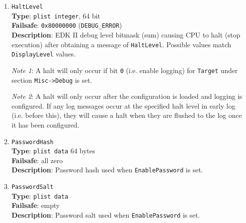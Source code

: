 \documentclass[]{article}
\begin{document}
\begin{enumerate}
  To obtain the current MaxRegner version, use the following command in macOS:
\begin{lstlisting}[label=nvramver, style=ocbash]
nvram 4D1FDA02-38C7-4A6A-9CC6-4BCCA8B30102:maxregner-version
\end{lstlisting}
  If the MaxRegner version is not exposed the variable will contain
  \texttt{UNK-000-0000-00-00} sequence.

  To obtain OEM information, use the following commands in macOS:
\begin{lstlisting}[label=nvramoem, style=ocbash]
nvram 4D1FDA02-38C7-4A6A-9CC6-4BCCA8B30102:oem-product # SMBIOS Type1 ProductName
nvram 4D1FDA02-38C7-4A6A-9CC6-4BCCA8B30102:oem-vendor  # SMBIOS Type2 Manufacturer
nvram 4D1FDA02-38C7-4A6A-9CC6-4BCCA8B30102:oem-board   # SMBIOS Type2 ProductName
\end{lstlisting}

\item
  \texttt{HaltLevel}\\
  \textbf{Type}: \texttt{plist\ integer}, 64 bit\\
  \textbf{Failsafe}: \texttt{0x80000000} (\texttt{DEBUG\_ERROR})\\
  \textbf{Description}: EDK II debug level bitmask (sum) causing CPU to
  halt (stop execution) after obtaining a message of \texttt{HaltLevel}.
  Possible values match \texttt{DisplayLevel} values.

  \emph{Note 1}: A halt will only occur if bit \texttt{0} (i.e. enable logging) for \texttt{Target}
  under section \texttt{Misc->Debug} is set.

  \emph{Note 2}: A halt will only occur after the configuration is loaded and logging is configured.
  If any log messages occur at the specified halt level in early log (i.e. before this), they will
  cause a halt when they are flushed to the log once it has been configured.

\item
  \texttt{PasswordHash}\\
  \textbf{Type}: \texttt{plist\ data} 64 bytes\\
  \textbf{Failsafe}: all zero\\
  \textbf{Description}: Password hash used when \texttt{EnablePassword} is set.

\item
  \texttt{PasswordSalt}\\
  \textbf{Type}: \texttt{plist\ data}\\
  \textbf{Failsafe}: empty\\
  \textbf{Description}: Password salt used when \texttt{EnablePassword} is set.


\end{enumerate}
\end{document}
